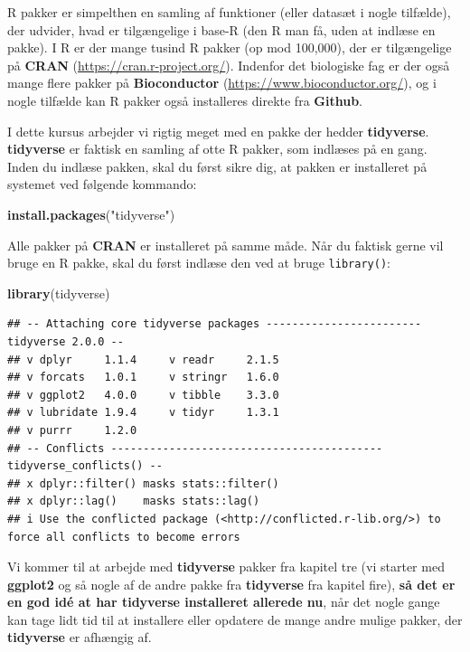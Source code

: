 \documentclass[
]{book}
\newenvironment{Shaded}{\begin{snugshade}}{\end{snugshade}}
\newcommand{\FunctionTok}[1]{\textcolor[rgb]{0.13,0.29,0.53}{\textbf{#1}}}
\newcommand{\NormalTok}[1]{#1}
\newcommand{\StringTok}[1]{\textcolor[rgb]{0.31,0.60,0.02}{#1}}
\begin{document}
R pakker er simpelthen en samling af funktioner (eller datasæt i nogle tilfælde), der udvider, hvad er tilgængelige i base-R (den R man få, uden at indlæse en pakke). I R er der mange tusind R pakker (op mod 100,000), der er tilgængelige på \textbf{CRAN} (\url{https://cran.r-project.org/}). Indenfor det biologiske fag er der også mange flere pakker på \textbf{Bioconductor} (\url{https://www.bioconductor.org/}), og i nogle tilfælde kan R pakker også installeres direkte fra \textbf{Github}.

I dette kursus arbejder vi rigtig meget med en pakke der hedder \textbf{tidyverse}. \textbf{tidyverse} er faktisk en samling af otte R pakker, som indlæses på en gang. Inden du indlæse pakken, skal du først sikre dig, at pakken er installeret på systemet ved følgende kommando:

\begin{Shaded}
\begin{Highlighting}[]
\FunctionTok{install.packages}\NormalTok{(}\StringTok{"tidyverse"}\NormalTok{)}
\end{Highlighting}
\end{Shaded}

Alle pakker på \textbf{CRAN} er installeret på samme måde. Når du faktisk gerne vil bruge en R pakke, skal du først indlæse den ved at bruge \texttt{library()}:

\begin{Shaded}
\begin{Highlighting}[]
\FunctionTok{library}\NormalTok{(tidyverse)}
\end{Highlighting}
\end{Shaded}

\begin{verbatim}
## -- Attaching core tidyverse packages ------------------------ tidyverse 2.0.0 --
## v dplyr     1.1.4     v readr     2.1.5
## v forcats   1.0.1     v stringr   1.6.0
## v ggplot2   4.0.0     v tibble    3.3.0
## v lubridate 1.9.4     v tidyr     1.3.1
## v purrr     1.2.0     
## -- Conflicts ------------------------------------------ tidyverse_conflicts() --
## x dplyr::filter() masks stats::filter()
## x dplyr::lag()    masks stats::lag()
## i Use the conflicted package (<http://conflicted.r-lib.org/>) to force all conflicts to become errors
\end{verbatim}

Vi kommer til at arbejde med \textbf{tidyverse} pakker fra kapitel tre (vi starter med \textbf{ggplot2} og så nogle af de andre pakke fra \textbf{tidyverse} fra kapitel fire), \textbf{så det er en god idé at har tidyverse installeret allerede nu}, når det nogle gange kan tage lidt tid til at installere eller opdatere de mange andre mulige pakker, der \textbf{tidyverse} er afhængig af.
\end{document}
